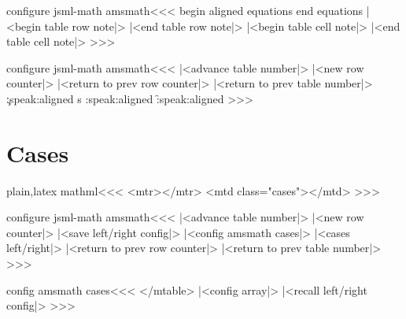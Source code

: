 {\<configure jsml-math amsmath\><<<
   {begin 
       aligned equations}
   {end  equations}
   {|<begin table row note|>}
   {|<end table row note|>}
   {|<begin table cell note|>}
   {|<end table cell note|>}
>>>



\<configure jsml-math amsmath\><<<
   {|<advance table number|>%
    |<new row counter|>%
    }
   {%
    \ifvmode \IgnorePar\fi {}%
    |<return to prev row counter|>%
    |<return to prev table number|>}
   {\c:speak:aligned}%
   {\xdef\hrow:s{\HRow}}%
   {%
    \e:speak:aligned }
   {\f:speak:aligned
    }
>>>


\section{Cases}

\<plain,latex mathml\><<<
    {}{} {}{}
    {\Tg<mtr>}{\Tg</mtr>}
    {\Tg<mtd class="cases">}{\Tg</mtd>}
>>>


\<configure jsml-math amsmath\><<<
   {|<advance table number|>%
    |<new row counter|>%
    \bgroup
       |<save left/right config|>%
       |<config amsmath cases|>%
       |<cases left/right|>%
   }
   {\egroup{}%
    |<return to prev row counter|>%
    |<return to prev table number|>}
   {}{}
>>>






\<config amsmath cases\><<<
   {} %
   {%
    \ifvmode \IgnorePar\fi \Tg</mtable>}
   {}
   {}%
   {%
    \bgroup
       |<config array|>%
       |<recall left/right config|>%
   }
   {\egroup {}}
>>>

}
